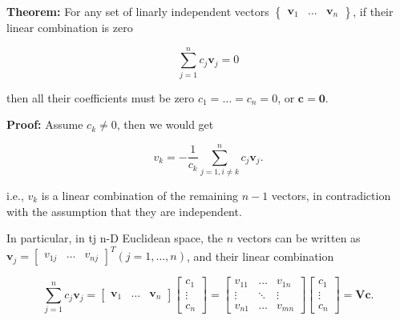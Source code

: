 \documentclass[10pt,b5paper,titlepage]{book}
\begin{document}
\begin{itemize}
        \textbf{Theorem:} For any set of linarly independent vectors
        $\begin{Bmatrix} \mathbf{v}_1 & \ldots & \mathbf{v}_n \end{Bmatrix}$,
        if their linear combination is zero

        \begin{equation}
            \sum_{j=1}^{n} c_{j} \mathbf{v}_{j} = 0
        \end{equation}

        then all their coefficients must be zero $c_1 = \ldots = c_{n} = 0$,
        or $\mathbf{c} = \mathbf{0}$.

        \textbf{Proof:} Assume $c_{k} \neq 0$, then we would get

        \begin{equation}
            v_{k} = - \frac{1}{c_{k}} \sum_{j=1, i \neq k}^{n} c_{j} \mathbf{v}_{j}
        .\end{equation}

        i.e., $v_{k}$ is a linear combination of the remaining $n - 1$ vectors,
        in contradiction with the assumption that they are independent.

        In particular, in tj n-D Euclidean space, the $n$ vectors can be written as
        $\mathbf{v}_{j} = \begin{bmatrix} v_{1j} & \ldots & v_{nj} \end{bmatrix}^{T} (j = 1, \ldots, n)$,
        and their linear combination

        \begin{equation}
            \sum_{j=1}^{n} c_{j} \mathbf{v}_{j}
            = \begin{bmatrix}
               \mathbf{v}_1 & \ldots & \mathbf{v}_n
            \end{bmatrix}
            \begin{bmatrix}
                c_1\\ \vdots\\ c_n
            \end{bmatrix}
            = \begin{bmatrix}
                v_{11} & \ldots & v_{1n}\\
                \vdots & \ddots & \vdots\\
                v_{n1} & \ldots & v_{mn}
            \end{bmatrix}
            \begin{bmatrix} c_1\\ \vdots\\ c_n \end{bmatrix}
            = \mathbf{V} \mathbf{c}
        .\end{equation}


\end{itemize}
\end{document}
